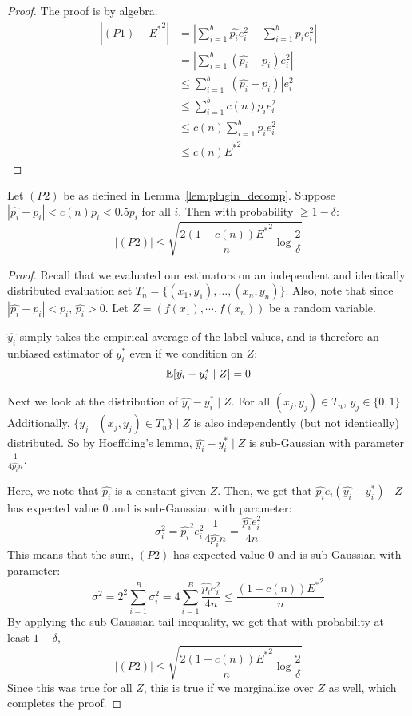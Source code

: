 \begin{proof}
The proof is by algebra. 
\begin{align*}
|(P1) - {E^*}^2| &= | \sum_{i=1}^b \hat{p_i}e_i^2 - \sum_{i=1}^b p_i e_i^2 | \\
&= | \sum_{i=1}^b (\hat{p_i} - p_i) e_i^2 | \\
&\leq \sum_{i=1}^b |(\hat{p_i} - p_i)| e_i^2 \\
&\leq \sum_{i=1}^b c(n) p_i e_i^2 \\
&\leq c(n) \sum_{i=1}^b p_i e_i^2 \\
&\leq c(n) {E^*}^2
\end{align*}
\end{proof}

\begin{lemma}
\label{lem:p2_bound}
Let $(P2)$ be as defined in Lemma~\ref{lem:plugin_decomp}.
Suppose $|\hat{p_i} - p_i| < c(n)p_i < 0.5p_i$ for all $i$. Then with probability $\geq 1 - \delta$:
\[ |(P2)| \leq \sqrt{\frac{2(1+c(n)){E^*}^2}{n} \log{\frac{2}{\delta}}} \]
\end{lemma}

\begin{proof}
Recall that we evaluated our estimators on an independent and identically distributed evaluation set $T_n = \{(x_1, y_1), \dots, (x_n, y_n)\}$. Also, note that since $|\hat{p_i} - p_i| < p_i$, $\hat{p_i} > 0$. Let $Z = (f(x_1), \cdots, f(x_n))$ be a random variable. 

$\hat{y_i}$ simply takes the empirical average of the label values, and is therefore an unbiased estimator of $y_i^*$ even if we condition on $Z$:
\[ \mathbb{E}[\hat{y_i} - y_i^* \mid Z] = 0 \]

Next we look at the distribution of $\hat{y_i} - y_i^* \mid Z$. For all $(x_j, y_j) \in T_n$, $y_j \in \{0, 1\}$. Additionally, $\{y_j \mid (x_j, y_j) \in T_n\} \mid Z$ is also independently (but not identically) distributed. So by Hoeffding's lemma, $\hat{y_i} - y_i^* \mid Z$ is sub-Gaussian with parameter $\frac{1}{4 \hat{p_i} n}$.

Here, we note that $\hat{p_i}$ is a constant given $Z$.
Then, we get that $\hat{p_i}e_i(\hat{y_i} - y_i^*) \mid Z$ has expected value $0$ and is sub-Gaussian with parameter:
\[ \sigma_i^2 = \hat{p_i}^2 e_i^2 \frac{1}{4 \hat{p_i} n} = \frac{\hat{p_i} e_i^2}{4n} \]
This means that the sum, $(P2)$ has expected value $0$ and is sub-Gaussian with  parameter:
\[ \sigma^2 = 2^2 \sum_{i=1}^B \sigma_i^2 = 4 \sum_{i=1}^B \frac{\hat{p_i} e_i^2}{4n} \leq \frac{(1+c(n)){E^*}^2}{n} \]
By applying the sub-Gaussian tail inequality, we get that with probability at least $1-\delta$,
\[ |(P2)| \leq \sqrt{\frac{2(1+c(n)){E^*}^2}{n} \log{\frac{2}{\delta}}} \]
Since this was true for all $Z$, this is true if we marginalize over $Z$ as well, which completes the proof.
\end{proof}

